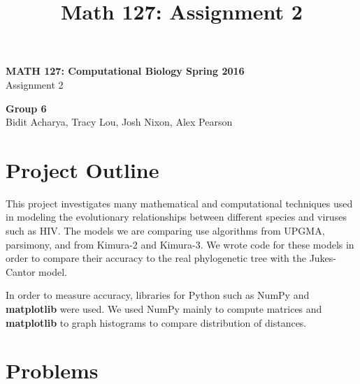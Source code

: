 \documentclass[11pt]{article}
\title{Math 127: Assignment 2}
\theoremstyle{definition}\newtheorem*{problem}{Problem}
\theoremstyle{remark}\newtheorem{claim}{Claim}
\theoremstyle{remark}\newtheorem*{sol}{Solution}
\begin{document}
\begin{center} {\Large \bf MATH 127: Computational Biology Spring 2016 } \\
                [8pt]{Assignment 2\\ [8pt]}\end{center}
                
                \begin{center} \textbf{Group 6}\\ Bidit Acharya, Tracy Lou, Josh Nixon, Alex Pearson
                \end{center}
                
\section{Project Outline}

This project investigates many mathematical and computational techniques used in modeling the evolutionary relationships between different species and viruses such as HIV. The models we are comparing use algorithms from UPGMA, parsimony, and from Kimura-2 and Kimura-3. We wrote code for these models in order to compare their accuracy to the real phylogenetic tree with the Jukes- Cantor model.

In order to measure accuracy, libraries for Python such as NumPy and \textbf{matplotlib} were used. We used NumPy mainly to compute matrices and \textbf{matplotlib} to graph histograms to compare distribution of distances. 




\section{Problems}
\end{document}
